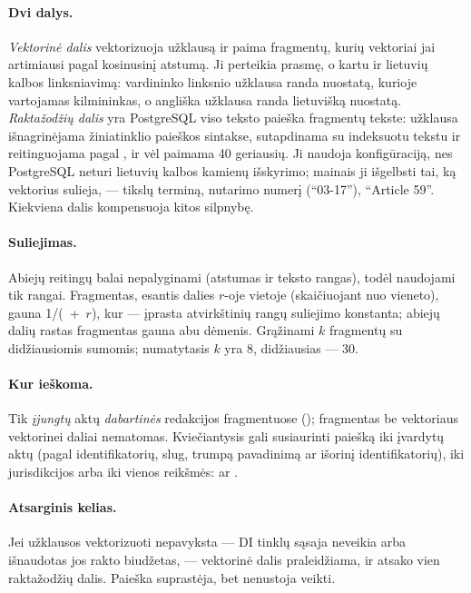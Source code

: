 \paragraph{Dvi dalys.} \emph{Vektorinė dalis} vektorizuoja užklausą ir paima
 fragmentų, kurių vektoriai jai artimiausi pagal kosinusinį atstumą. Ji
perteikia prasmę, o kartu ir lietuvių kalbos linksniavimą: vardininko linksnio užklausa randa
nuostatą, kurioje vartojamas kilmininkas, o angliška užklausa randa lietuvišką nuostatą.
\emph{Raktažodžių dalis} yra PostgreSQL viso teksto paieška fragmentų tekste: užklausa
išnagrinėjama žiniatinklio paieškos sintakse, sutapdinama su indeksuotu tekstu ir reitinguojama
pagal , ir vėl paimama 40 geriausių. Ji naudoja  konfigūraciją, nes
PostgreSQL neturi lietuvių kalbos kamienų išskyrimo; mainais ji išgelbsti tai, ką vektorius
sulieja, --- tikslų terminą, nutarimo numerį (\enquote{03-17}), \enquote{Article 59}. Kiekviena
dalis kompensuoja kitos silpnybę.

\paragraph{Suliejimas.} Abiejų reitingų balai nepalyginami (atstumas ir teksto rangas), todėl
naudojami tik rangai. Fragmentas, esantis dalies $r$-oje vietoje (skaičiuojant nuo vieneto),
gauna 1/(~+~$r$), kur  --- įprasta atvirkštinių rangų suliejimo
konstanta; abiejų dalių rastas fragmentas gauna abu dėmenis. Grąžinami $k$ fragmentų su
didžiausiomis sumomis; numatytasis $k$ yra 8, didžiausias --- 30.

\paragraph{Kur ieškoma.} Tik \emph{įjungtų} aktų \emph{dabartinės} redakcijos fragmentuose
(); fragmentas be vektoriaus vektorinei daliai nematomas. Kviečiantysis
gali susiaurinti paiešką iki įvardytų aktų (pagal identifikatorių, slug, trumpą pavadinimą ar
išorinį identifikatorių), iki jurisdikcijos arba iki vienos  reikšmės:  ar
.

\paragraph{Atsarginis kelias.} Jei užklausos vektorizuoti nepavyksta --- DI tinklų sąsaja neveikia
arba išnaudotas jos rakto biudžetas, --- vektorinė dalis praleidžiama, ir atsako vien
raktažodžių dalis. Paieška suprastėja, bet nenustoja veikti.

